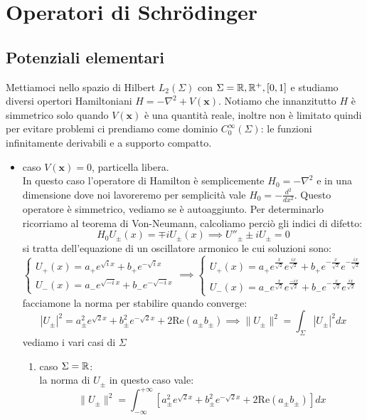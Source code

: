 \section{Operatori di Schr{\"o}dinger}
\subsection{Potenziali elementari}
Mettiamoci nello spazio di Hilbert $L_2(\Sigma)$ con $\Sigma=\mathbb{R},\mathbb{R}^+,[0,1]$ e studiamo diversi opertori Hamiltoniani $H = -\nabla^2 + V(\mathbf{x})$. Notiamo che innanzitutto $H$ è simmetrico solo quando $V(\mathbf{x})$ è una quantità reale, inoltre non è limitato quindi per evitare problemi ci prendiamo come dominio $C_0^\infty(\Sigma)$: le funzioni infinitamente derivabili e a supporto compatto. 
\begin{itemize}
\item caso $V(\mathbf{x}) = 0$, particella libera.\\
\newline In questo caso l'operatore di Hamilton è semplicemente $H_0 = -\nabla^2$ e in una dimensione dove noi lavoreremo per semplicità vale $H_0 = -\frac{d^2}{dx^2}$. Questo operatore è simmetrico, vediamo se è autoaggiunto. Per determinarlo ricorriamo al teorema di Von-Neumann, calcoliamo perciò gli indici di difetto:
\[H_0U_\pm(x) = \mp iU_\pm(x) \implies U''_\pm \pm iU_\pm = 0 \]
si tratta dell'equazione di un oscillatore armonico le cui soluzioni sono:
\[\begin{cases}
U_+(x) = a_+e^{\sqrt{i}x} + b_+e^{-\sqrt{i}x} \\
U_-(x) = a_-e^{\sqrt{-i}x} + b_-e^{-\sqrt{-i}x} 
\end{cases} 
\implies
\begin{cases}
U_+(x) = a_+e^{\frac{x}{\sqrt{2}}}e^{\frac{ix}{\sqrt{2}}} + b_+e^{-\frac{x}{\sqrt{2}}}e^{-\frac{ix}{\sqrt{2}}} \\
U_-(x) = a_-e^{\frac{x}{\sqrt{2}}}e^{\frac{-ix}{\sqrt{2}}} + b_-e^{-\frac{x}{\sqrt{2}}}e^{\frac{ix}{\sqrt{2}}} 
\end{cases}
\]
facciamone la norma per stabilire quando converge:
\[|U_\pm|^2 = a_\pm^2e^{\sqrt{2}x} + b_\pm^2e^{-\sqrt{2}x} + 2\text{Re}(a_\pm b_\pm) \implies \|U_\pm\|^2 = \int_\Sigma|U_\pm|^2dx\]
vediamo i vari casi  di $\Sigma$
\begin{enumerate}
\item caso $\Sigma = \mathbb{R}$:\\
la norma di $U_\pm$ in questo caso vale:
\[ \|U_\pm\|^2 = \int_{-\infty}^{+\infty}[a_\pm^2e^{\sqrt{2}x} + b_\pm^2e^{-\sqrt{2}x} + 2\text{Re}(a_\pm b_\pm)]dx\]

\end{enumerate}
\end{itemize}
